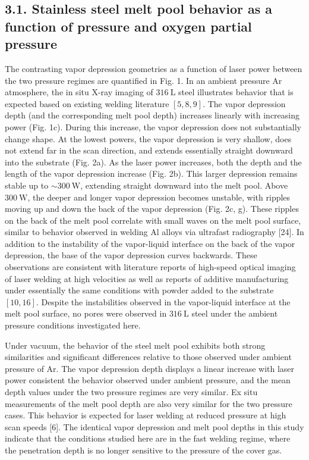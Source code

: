 \documentclass[10pt]{article}
\begin{document}
\subsection*{3.1. Stainless steel melt pool behavior as a function of pressure and oxygen partial pressure}
The contrasting vapor depression geometries as a function of laser power between the two pressure regimes are quantified in Fig. 1. In an ambient pressure Ar atmosphere, the in situ X-ray imaging of $316 \mathrm{~L}$ steel illustrates behavior that is expected based on existing welding literature $[5,8,9]$. The vapor depression depth (and the corresponding melt pool depth) increases linearly with increasing power (Fig. 1c). During this increase, the vapor depression does not substantially change shape. At the lowest powers, the vapor depression is very shallow, does not extend far in the scan direction, and extends essentially straight downward into the substrate (Fig. 2a). As the laser power increases, both the depth and the length of the vapor depression increase (Fig. 2b). This larger depression remains stable up to $\sim 300 \mathrm{~W}$, extending straight downward into the melt pool. Above $300 \mathrm{~W}$, the deeper and longer vapor depression becomes unstable, with ripples moving up and down the back of the vapor depression (Fig. 2c, g). These ripples on the back of the melt pool correlate with small waves on the melt pool surface, similar to behavior observed in welding $\mathrm{Al}$ alloys via ultrafast radiography [24]. In addition to the instability of the vapor-liquid interface on the back of the vapor depression, the base of the vapor depression curves backwards. These observations are consistent with literature reports of high-speed optical imaging of laser welding at high velocities as well as reports of additive manufacturing under essentially the same conditions with powder added to the substrate $[10,16]$. Despite the instabilities observed in the vapor-liquid interface at the melt pool surface, no pores were observed in $316 \mathrm{~L}$ steel under the ambient pressure conditions investigated here.

Under vacuum, the behavior of the steel melt pool exhibits both strong similarities and significant differences relative to those observed under ambient pressure of Ar. The vapor depression depth displays a linear increase with laser power consistent the behavior observed under ambient pressure, and the mean depth values under the two pressure regimes are very similar. Ex situ measurements of the melt pool depth are also very similar for the two pressure cases. This behavior is expected for laser welding at reduced pressure at high scan speeds [6]. The identical vapor depression and melt pool depths in this study indicate that the conditions studied here are in the fast welding regime, where the penetration depth is no longer sensitive to the pressure of the cover gas.
\end{document}
